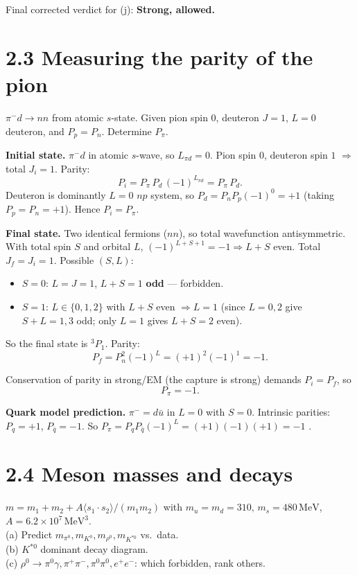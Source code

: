 \documentclass[11pt]{article}
\newcommand{\Q}[1]{\begin{question}#1\end{question}}
\newcommand{\MeV}{\,\mathrm{MeV}}
\begin{document}
Final corrected verdict for (j): \textbf{Strong, allowed.}

\section*{2.3 \quad Measuring the parity of the pion}

\Q{$\pi^-d\to nn$ from atomic $s$-state. Given pion spin 0, deuteron $J=1$, $L=0$ deuteron, and $P_p=P_n$. Determine $P_\pi$.}

\textbf{Initial state.} $\pi^-d$ in atomic $s$-wave, so $L_{\pi d}=0$. Pion spin $0$, deuteron spin $1$ $\Rightarrow$ total $J_i=1$. Parity:
\[
P_i = P_\pi\,P_d\,(-1)^{L_{\pi d}}=P_\pi\,P_d.
\]
Deuteron is dominantly $L=0$ $np$ system, so $P_d=P_n P_p (-1)^{0}=+1$ (taking $P_p=P_n=+1$). Hence $P_i=P_\pi$.

\textbf{Final state.} Two identical fermions ($nn$), so total wavefunction antisymmetric. With total spin $S$ and orbital $L$, $(-1)^{L+S+1}=-1\Rightarrow L+S$ even. Total $J_f=J_i=1$. Possible $(S,L)$:
\begin{itemize}[itemsep=0pt]
\item $S=0$: $L=J=1$, $L+S=1$ \textbf{odd} --- forbidden.
\item $S=1$: $L\in\{0,1,2\}$ with $L+S$ even $\Rightarrow L=1$ (since $L=0,2$ give $S+L=1,3$ odd; only $L=1$ gives $L+S=2$ even).
\end{itemize}
So the final state is $^3P_1$. Parity:
\[
P_f = P_n^{2}(-1)^{L}=(+1)^{2}(-1)^{1}=-1.
\]

Conservation of parity in strong/EM (the capture is strong) demands $P_i=P_f$, so
\[
\boxed{\;P_\pi=-1.\;}
\]

\textbf{Quark model prediction.} $\pi^-=d\bar u$ in $L=0$ with $S=0$. Intrinsic parities: $P_q=+1$, $P_{\bar q}=-1$. So $P_\pi=P_q P_{\bar q}(-1)^L=(+1)(-1)(+1)=-1$ \checkmark.

\section*{2.4 \quad Meson masses and decays}

\Q{$m=m_1+m_2+A\langle s_1\cdot s_2\rangle/(m_1 m_2)$ with $m_u=m_d=310,\,m_s=480\MeV$, $A=6.2\times 10^{7}\MeV^{3}$.\\
(a) Predict $m_{\pi^0},m_{K^0},m_{\rho^0},m_{K^{*0}}$ vs.\ data.\\
(b) $K^{*0}$ dominant decay diagram.\\
(c) $\rho^0\to\pi^0\gamma,\pi^+\pi^-,\pi^0\pi^0,e^+e^-$: which forbidden, rank others.}
\end{document}
